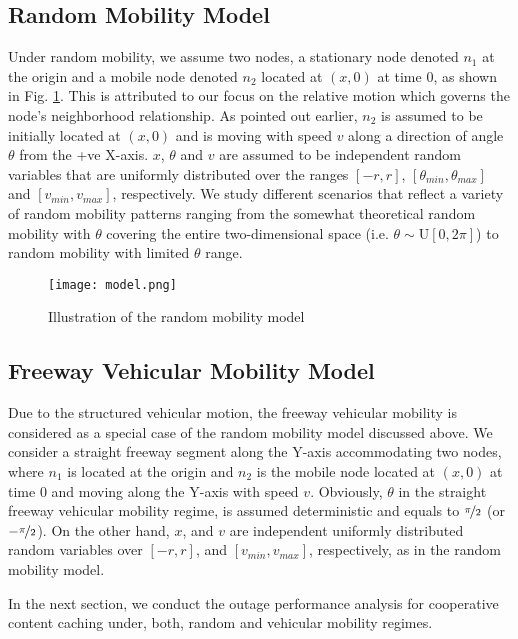 \documentclass[conference,a4paper]{IEEEtran}
\begin{document}
\subsection{Random Mobility Model}
Under random mobility, we assume two nodes, a stationary node denoted $n_1$ at the origin and a mobile node denoted $n_2$ located at $(x,0)$ at time $0$, as shown in Fig. \ref{Flo:model}. This is attributed to our focus on the relative motion which governs the node's neighborhood relationship. As pointed out earlier, $n_2$ is assumed to be initially located at $(x,0)$ and is moving with speed $v$ along a direction of angle $\theta$ from the +ve X-axis. $x$, $\theta$ and $v$ are assumed to be independent random variables that are uniformly distributed over the ranges $[-r,r]$, $[\theta_{min}, \theta_{max}]$ and $[v_{min}, v_{max}]$, respectively.  We study different scenarios that reflect a variety of random mobility patterns ranging from the somewhat theoretical random mobility with $\theta$ covering the entire two-dimensional space (i.e. $\theta \sim \mathrm{U}[0, 2\pi]$) to random mobility with limited $\theta$ range.
\begin{figure}[!t]
\centering
\texttt{[image: model.png]}
\setlength{\abovecaptionskip}{0pt}
\setlength{\belowcaptionskip}{-10pt}
\caption{Illustration of the random mobility model}
\label{Flo:model}
\end{figure}


\subsection{Freeway Vehicular Mobility Model}
Due to the structured vehicular motion, the freeway vehicular mobility is considered as a special case of the random mobility model discussed above. We consider a straight freeway segment along the Y-axis accommodating two nodes, where $n_1$ is located  at the origin and $n_2$ is the mobile node located at $(x,0)$ at time $0$ and moving along the Y-axis with speed $v$. Obviously, $\theta$ in the straight freeway vehicular mobility regime, is assumed deterministic and equals to $\nicefrac{\pi}{2}$ (or $- \nicefrac{\pi}{2}$). On the other hand, $x$, and $v$ are independent uniformly distributed random variables over $[-r,r]$, and $[v_{min}, v_{max}]$, respectively, as in the random mobility model.

In the next section, we conduct the outage performance analysis for cooperative content caching under, both, random and vehicular mobility regimes.
\end{document}
